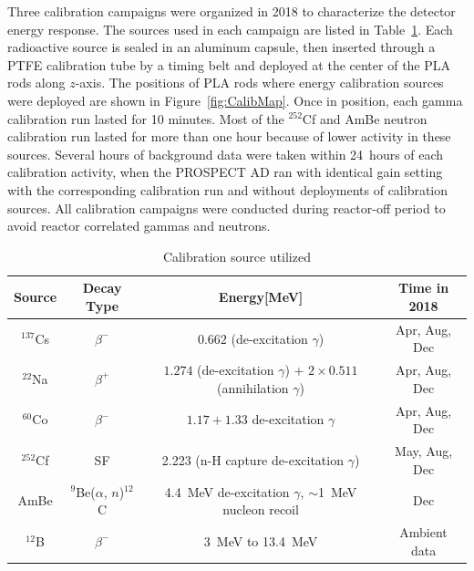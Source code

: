 \label{sec:calibration}

Three calibration campaigns were organized in 2018 to characterize the detector energy response.
The sources used in each campaign are listed in Table~\ref{tab:src_table}.
Each radioactive source is sealed in an aluminum capsule, then inserted through a PTFE calibration tube by a timing belt and deployed at the center of the PLA rods along $z$-axis.
The positions of PLA rods where energy calibration sources were deployed are shown in Figure~\ref{fig:CalibMap}.
Once in position, each gamma calibration run lasted for 10 minutes.
Most of the $^{252}$Cf and AmBe neutron calibration run lasted for more than one hour because of lower activity in these sources.
Several hours of background data were taken within 24~hours of each calibration activity, when the PROSPECT AD ran with identical gain setting with the corresponding calibration run and without deployments of calibration sources. 
All calibration campaigns were conducted during reactor-off period to avoid reactor correlated gammas and neutrons.

\FloatBarrier
\begin{table}
    \centering
    \caption{Calibration source utilized}
    \begin{tabular}{cccc}
    		\hline
    		\hline
        Source & Decay Type & Energy[MeV] & Time in 2018\\
        \hline
        $^{137}$Cs  & $\beta^-$   & $0.662$ (de-excitation $\gamma$) &Apr, Aug, Dec\\
        $^{22}$Na   & $\beta^+$   & $1.274$ (de-excitation $ \gamma$) + $2\times0.511$ (annihilation $\gamma$) &Apr, Aug, Dec\\
        $^{60}$Co   & $\beta^-$   & $1.17 + 1.33$ de-excitation $\gamma$ &Apr, Aug, Dec \\
        \hline
        $^{252}$Cf  & SF   & 2.223 (n-H capture de-excitation $\gamma$) &May, Aug, Dec \\
        \hline
        AmBe	& $^{9}$Be($\alpha$, $n$)$^{12}$C	& 4.4~MeV  de-excitation $\gamma$, $\sim$1~MeV nucleon recoil & Dec \\
        \hline
        $^{12}$B	&	$\beta^-$ & 3~MeV to 13.4~MeV & Ambient data \\
        \hline
    \end{tabular}
    \label{tab:src_table}
\end{table}
\FloatBarrier

